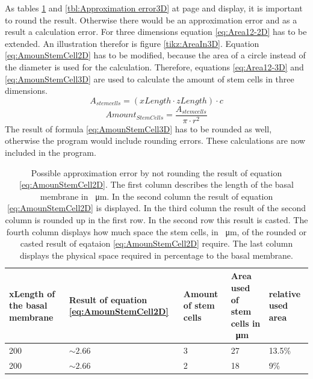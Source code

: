 As tables \ref{tbl:Approximation error2D} and \ref{tbl:Approximation error3D} at page \pageref{eq:AmounStemCell2D} and \pageref{tbl:Approximation error3D} display, it is important to round the result. Otherwise there would be an approximation error and as a result a calculation error. \newline
For three dimensions equation \ref{eq:Area12-2D} has to be extended. An illustration therefor is figure \ref{tikz:AreaIn3D}. Equation \ref{eq:AmounStemCell2D} has to be modified, because the area of a circle instead of the diameter is used for the calculation. Therefore, equations \ref{eq:Area12-3D} and \ref{eq:AmounStemCell3D} are used to calculate the amount of stem cells in three dimensions.
\begin{equation}\label{eq:Area12-3D}
A_{stem cells} = (xLength \cdot zLength) \cdot c
\end{equation}
\begin{equation}\label{eq:AmounStemCell3D}
Amount_{StemCells} = \dfrac{A_{stem cells}}{\pi \cdot r^{2}} 
\end{equation}
The result of formula \ref{eq:AmounStemCell3D} has to be rounded as well, otherwise the program would include rounding errors. 
These calculations are now included in the program.


\begin{table}[ht]
\centering
\caption[Approximation errors of a not rounded result, with which it is further calculated]{Possible approximation error by not rounding the result of equation \ref{eq:AmounStemCell2D}. The first column describes the length of the basal membrane in \SI{}{\micro\metre}. In the second column the result of equation \ref{eq:AmounStemCell2D} is displayed. In the third column the result of the second column is rounded up in the first row. In the second row this result is casted. The fourth column displays how much space the stem cells, in \SI{}{\micro\metre}, of the rounded or casted result of eqataion \ref{eq:AmounStemCell2D} require. The last column displays the physical space required in percentage to the basal membrane. \newline}
\renewcommand{\arraystretch}{1.5}
	\begin{tabularx}{\textwidth}{|X|X|X|X|X|}
	\hline
		xLength of the basal membrane & Result of equation \ref{eq:AmounStemCell2D} & Amount of stem cells & Area used of stem cells  in \SI{}{\micro\metre} & relative used area  \\
		\hline
	\hline
		
		200 & $\sim 2.66$ & 3 & 27 & 13.5\% \\
		\hline
		200 & $\sim 2.66$ & 2 & 18 & 9\% 
\tabularnewline
\hline 
	\end{tabularx}
	\label{tbl:Approximation error2D}
\end{table}


